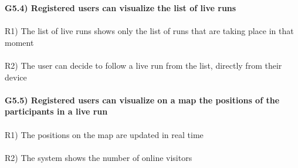 \textbf{G5.4) Registered users can visualize the list of live runs} \\ \\
R1) The list of live runs shows only the list of runs that are taking place in that moment \\ \\
R2) The user can decide to follow a live run from the list, directly from their device \\ \\
\textbf{G5.5) Registered users can visualize on a map the positions of the participants in a live run} \\ \\	
R1) The positions on the map are updated in real time \\ \\
R2) The system shows the number of online visitors \\


